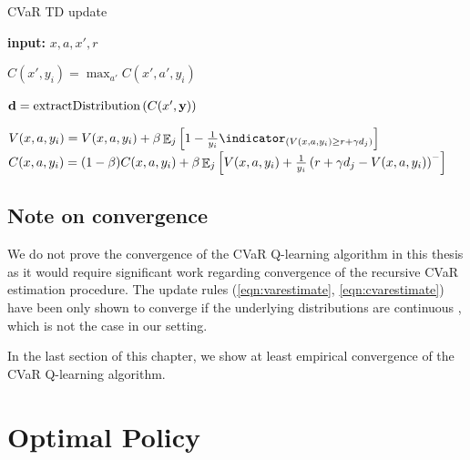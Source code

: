 \begin{algorithm}
\caption{CVaR TD update}
\begin{algorithmic}[1]\label{alg:cvartd}

    \STATE \textbf{input:} $x, a, x', r$
    
	\STATE $C(x', y_i) = \max_{a'} C(x', a', y_i)$ \label{alg:cvartd:1}
	\ENDFOR
	
	\STATE $\mathbf{d}= \text{extractDistribution}\left( {C(x', \mathbf{y})} \right)$ \label{alg:cvartd:2}

	\STATE $V(x, a, y_i) = V(x, a, y_i) + \beta \expect_j\bsquare{1 - \frac{1}{y_i}\indicator_{(V(x, a, y_i) \ge r+\gamma d_j)}}$  \label{alg:cvartd:4}
	\STATE $C(x, a, y_i) = (1-\beta)C(x, a, y_i) + \beta\mathop{\mathbb{E}}_j\left[ {V(x, a, y_i) + \frac{1}{y_i}\left( {r+\gamma d_j - V(x, a, y_i)} \right)^-} \right]$\label{alg:cvartd:5}
	\ENDFOR
\end{algorithmic}
\end{algorithm}

\subsection{Note on convergence}
We do not prove the convergence of the CVaR Q-learning algorithm in this thesis as it would require significant work regarding convergence of the recursive CVaR estimation procedure. The update rules (\ref{eqn:varestimate}, \ref{eqn:cvarestimate})  have been only shown to converge if the underlying distributions are continuous \citep{bardou2009recursive}, which is not the case in our setting.


In the last section of this chapter, we show at least empirical convergence of the CVaR Q-learning algorithm.



\section{Optimal Policy}\label{sec:qpolicy}


